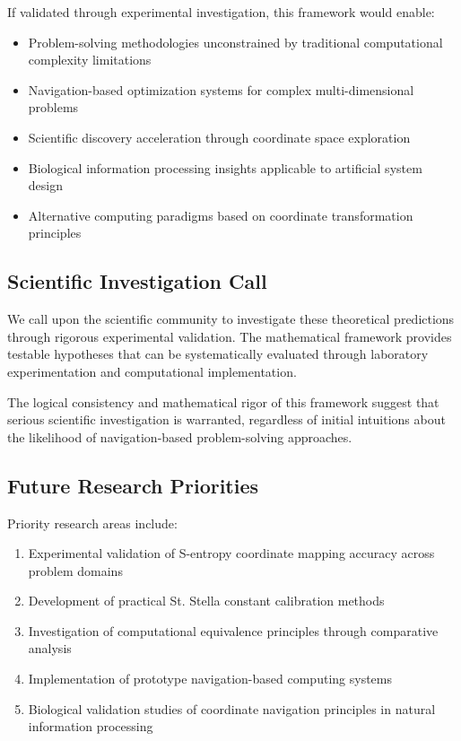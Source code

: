 \documentclass[11pt]{article}
\begin{document}
If validated through experimental investigation, this framework would enable:

\begin{itemize}
\item Problem-solving methodologies unconstrained by traditional computational complexity limitations
\item Navigation-based optimization systems for complex multi-dimensional problems
\item Scientific discovery acceleration through coordinate space exploration
\item Biological information processing insights applicable to artificial system design
\item Alternative computing paradigms based on coordinate transformation principles
\end{itemize}

\subsection{Scientific Investigation Call}

We call upon the scientific community to investigate these theoretical predictions through rigorous experimental validation. The mathematical framework provides testable hypotheses that can be systematically evaluated through laboratory experimentation and computational implementation.

The logical consistency and mathematical rigor of this framework suggest that serious scientific investigation is warranted, regardless of initial intuitions about the likelihood of navigation-based problem-solving approaches.

\subsection{Future Research Priorities}

Priority research areas include:

\begin{enumerate}
\item Experimental validation of S-entropy coordinate mapping accuracy across problem domains
\item Development of practical St. Stella constant calibration methods
\item Investigation of computational equivalence principles through comparative analysis
\item Implementation of prototype navigation-based computing systems
\item Biological validation studies of coordinate navigation principles in natural information processing
\end{enumerate}
\end{document}

